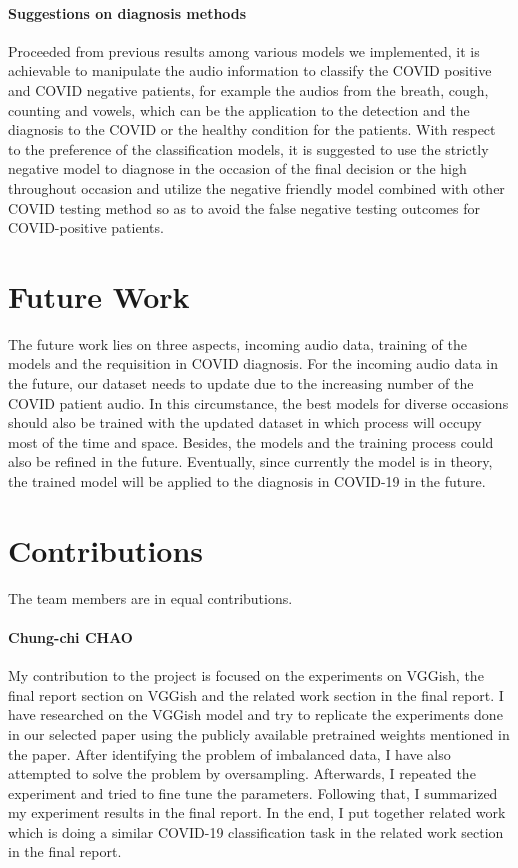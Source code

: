 \documentclass[11pt]{article}
\begin{document}
\paragraph{Suggestions on diagnosis methods}
Proceeded from previous results among various models we implemented, it is achievable to manipulate the audio information to classify the COVID positive and COVID negative patients, for example the audios from the breath, cough, counting and vowels, which can be the application to the detection and the diagnosis to the COVID or the healthy condition for the patients. With respect to the preference of the classification models, it is suggested to use the strictly negative model to diagnose in the occasion of the final decision or the high throughout occasion and utilize the negative friendly model combined with other COVID testing method so as to avoid the false negative testing outcomes for COVID-positive patients.


\section{Future Work}

The future work lies on three aspects, incoming audio data, training of the models and the requisition in COVID diagnosis. 
For the incoming audio data in the future, our dataset needs to update due to the increasing number of the COVID patient audio. In this circumstance, the best models for diverse occasions should also be trained with the updated dataset in which process will occupy most of the time and space. Besides, the models and the training process could also be refined in the future. Eventually, since currently the model is in theory, the trained model will be applied to the diagnosis in COVID-19 in the future.

\section{Contributions}

The team members are in equal contributions.

\paragraph{Chung-chi CHAO}

My contribution to the project is focused on the experiments on VGGish,
the final report section on VGGish and the related work section in the final report. 
I have researched on the VGGish model and try to replicate the experiments done 
in our selected paper using the publicly available pretrained weights mentioned in the paper. 
After identifying the problem of imbalanced data, I have also attempted to solve the problem by oversampling. 
Afterwards, I repeated the experiment and tried to fine tune the parameters. 
Following that, I summarized my experiment results in the final report. 
In the end, I put together related work which is doing a similar COVID-19 classification 
task in the related work section in the final report.
\end{document}
